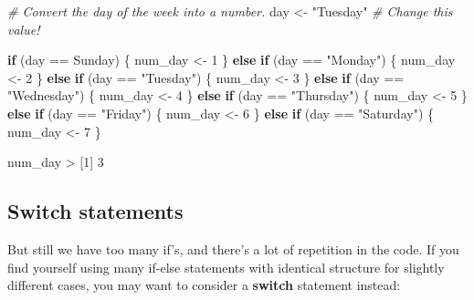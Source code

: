 \documentclass[
]{book}
\newenvironment{Shaded}{\begin{snugshade}}{\end{snugshade}}
\newcommand{\CommentTok}[1]{\textcolor[rgb]{0.56,0.35,0.01}{\textit{#1}}}
\newcommand{\ControlFlowTok}[1]{\textcolor[rgb]{0.13,0.29,0.53}{\textbf{#1}}}
\newcommand{\DecValTok}[1]{\textcolor[rgb]{0.00,0.00,0.81}{#1}}
\newcommand{\NormalTok}[1]{#1}
\newcommand{\OtherTok}[1]{\textcolor[rgb]{0.56,0.35,0.01}{#1}}
\newcommand{\SpecialCharTok}[1]{\textcolor[rgb]{0.00,0.00,0.00}{#1}}
\newcommand{\StringTok}[1]{\textcolor[rgb]{0.31,0.60,0.02}{#1}}
\begin{document}
\begin{Shaded}
\begin{Highlighting}[]
\CommentTok{\# Convert the day of the week into a number.}
\NormalTok{day }\OtherTok{\textless{}{-}} \StringTok{"Tuesday"} \CommentTok{\# Change this value!}

\ControlFlowTok{if}\NormalTok{ (day }\SpecialCharTok{==} \StringTok{\textquotesingle{}Sunday\textquotesingle{}}\NormalTok{) \{}
\NormalTok{  num\_day }\OtherTok{\textless{}{-}} \DecValTok{1}
\NormalTok{\} }\ControlFlowTok{else} \ControlFlowTok{if}\NormalTok{ (day }\SpecialCharTok{==} \StringTok{"Monday"}\NormalTok{) \{}
\NormalTok{  num\_day }\OtherTok{\textless{}{-}} \DecValTok{2}
\NormalTok{\} }\ControlFlowTok{else} \ControlFlowTok{if}\NormalTok{ (day }\SpecialCharTok{==} \StringTok{"Tuesday"}\NormalTok{) \{}
\NormalTok{  num\_day }\OtherTok{\textless{}{-}} \DecValTok{3}
\NormalTok{\} }\ControlFlowTok{else} \ControlFlowTok{if}\NormalTok{ (day }\SpecialCharTok{==} \StringTok{"Wednesday"}\NormalTok{) \{}
\NormalTok{  num\_day }\OtherTok{\textless{}{-}} \DecValTok{4}
\NormalTok{\} }\ControlFlowTok{else} \ControlFlowTok{if}\NormalTok{ (day }\SpecialCharTok{==} \StringTok{"Thursday"}\NormalTok{) \{}
\NormalTok{  num\_day }\OtherTok{\textless{}{-}} \DecValTok{5}
\NormalTok{\} }\ControlFlowTok{else} \ControlFlowTok{if}\NormalTok{ (day }\SpecialCharTok{==} \StringTok{"Friday"}\NormalTok{) \{}
\NormalTok{  num\_day }\OtherTok{\textless{}{-}} \DecValTok{6}
\NormalTok{\} }\ControlFlowTok{else} \ControlFlowTok{if}\NormalTok{ (day }\SpecialCharTok{==} \StringTok{"Saturday"}\NormalTok{) \{}
\NormalTok{  num\_day }\OtherTok{\textless{}{-}} \DecValTok{7}
\NormalTok{\}}

\NormalTok{num\_day}
\SpecialCharTok{\textgreater{}}\NormalTok{ [}\DecValTok{1}\NormalTok{] }\DecValTok{3}
\end{Highlighting}
\end{Shaded}

\hypertarget{switch-statements}{%
\subsection{Switch statements}\label{switch-statements}}

But still we have too many if's, and there's a lot of repetition in the code.
If you find yourself using many if-else statements with identical structure for
slightly different cases, you may want to consider a \textbf{switch} statement
instead:
\end{document}
